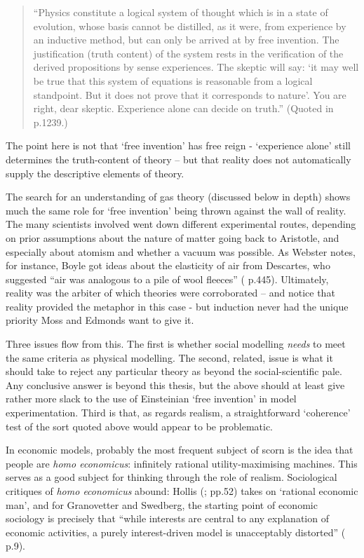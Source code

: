 \begin{quote}
``Physics constitute a logical system of thought which is in a state of evolution, whose basis cannot be distilled, as it were, from experience by an inductive method, but can only be arrived at by free invention. The justification (truth content) of the system rests in the verification of the derived propositions by sense experiences. The skeptic will say: `it may well be true that this system of equations is reasonable from a logical standpoint. But it does not prove that it corresponds to nature'. You are right, dear skeptic. Experience alone can decide on truth.'' (Quoted in \citealt{kaldor_irrelevance_1972} p.1239.)
\end{quote}

The point here is not that `free invention' has free reign - `experience alone' still determines the truth-content of theory – but that reality does not automatically supply the descriptive elements of theory. 

The search for an understanding of gas theory (discussed below in depth) shows much the same role for `free invention' being thrown against the wall of reality. The many scientists involved went down different experimental routes, depending on prior assumptions about the nature of matter going back to Aristotle, and especially about atomism and whether a vacuum was possible. As Webster notes, for instance, Boyle got ideas about the elasticity of air from Descartes, who suggested ``air was analogous to a pile of wool fleeces'' (\citealt{webster_discovery_1965} p.445). Ultimately, reality was the arbiter of which theories were corroborated – and notice that reality provided the metaphor in this case - but induction never had the unique priority Moss and Edmonds want to give it.

Three issues flow from this. The first is whether social modelling \emph{needs} to meet the same criteria as physical modelling. The second, related, issue is what it should take to reject any particular theory as beyond the social-scientific pale. Any conclusive answer is beyond this thesis, but the above should at least give rather more slack to the use of Einsteinian `free invention' in model experimentation. Third is that, as regards realism, a straightforward `coherence' test of the sort quoted above would appear to be problematic.

In economic models, probably the most frequent subject of scorn is the idea that people are \emph{homo economicus}: infinitely rational utility-maximising machines. This serves as a good subject for thinking through the role of realism. Sociological critiques of \emph{homo economicus} abound: Hollis (\citeyear{hollis_rational_1975}; \citeyear{hollis_philosophy_1994} pp.52) takes on `rational economic man', and for Granovetter and Swedberg, the starting point of economic sociology is precisely that ``while interests are central to any explanation of economic activities, a purely interest-driven model is unacceptably distorted'' (\citealt{granovetter_sociology_2001} p.9). 

